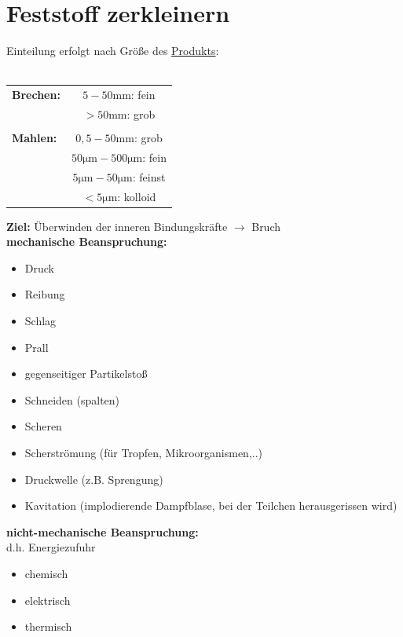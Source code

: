 \newpage

\section{Feststoff zerkleinern}
Einteilung erfolgt nach Größe des \underline{Produkts}:\\ \\
\vspace*{-5mm}
\renewcommand{\arraystretch}{1.2}
\begin{table}[h!]
	\centering
	\begin{tabulary}{\textwidth}{l|C}
		\textbf{Brechen:} & $5-50 \si{\milli\meter}$: fein \\ 
		&  $>50 \si{\milli\meter}$: grob\\ 
		\hline  
		& \\
		\textbf{Mahlen:} & $0,5-50 \si{\milli\meter}$: grob \\ 
		& $50 \si{\micro \meter}-500 \si{\micro \meter}$: fein \\ 
		& $5 \si{\micro \meter}-50 \si{\micro \meter}$: feinst \\ 
		& $<5 \si{\micro \meter}$: kolloid \\ 
	\end{tabulary} 
\end{table}
\FloatBarrier

\textbf{Ziel:} Überwinden der inneren Bindungskräfte $\rightarrow$ Bruch\\

\textbf{\large{mechanische Beanspruchung:}}
\begin{itemize}
	\item Druck
	\item Reibung
	\item Schlag
	\item Prall
	\item gegenseitiger Partikelstoß
	\item Schneiden (spalten)
	\item Scheren
	\item Scherströmung (für Tropfen, Mikroorganismen,..)
	\item Druckwelle (z.B. Sprengung)
	\item Kavitation (implodierende Dampfblase, bei der Teilchen herausgerissen wird)
\end{itemize}
\vspace*{5mm}
\textbf{\large{nicht-mechanische Beanspruchung:}}\\
d.h. Energiezufuhr
\begin{itemize}
	\item chemisch
	\item elektrisch
	\item thermisch
\end{itemize}


